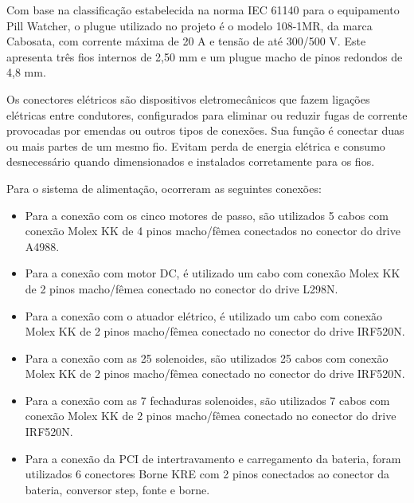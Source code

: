 Com base na classificação estabelecida na norma IEC 61140 para o equipamento Pill Watcher, o plugue utilizado no projeto é o modelo 108-1MR, da marca Cabosata, com corrente máxima de 20 A e tensão de até 300/500 V. Este apresenta três fios internos de 2,50 mm e um plugue macho de pinos redondos de 4,8 mm.  

Os conectores elétricos são dispositivos eletromecânicos que fazem ligações elétricas entre condutores, configurados para eliminar ou reduzir fugas de corrente provocadas por emendas ou outros tipos de conexões.  Sua função é conectar duas ou mais partes de um mesmo fio. Evitam perda de energia elétrica e consumo desnecessário quando dimensionados e instalados corretamente para os fios. 

Para o sistema de alimentação, ocorreram as seguintes conexões:


\begin{itemize}

      \item Para a conexão com os cinco motores de passo, são utilizados 5 cabos com conexão Molex KK de 4 pinos macho/fêmea conectados no conector do drive A4988.
    \item Para a conexão com motor DC, é utilizado um cabo com conexão Molex KK de 2 pinos macho/fêmea conectado no conector do drive L298N.
    \item Para a conexão com o atuador elétrico, é utilizado um cabo com conexão Molex KK de 2 pinos macho/fêmea conectado no conector do drive IRF520N.
     \item Para a conexão com as 25 solenoides, são utilizados 25 cabos com conexão Molex KK de 2 pinos macho/fêmea conectado no conector do drive IRF520N.
    \item Para a conexão com as 7 fechaduras solenoides, são utilizados 7 cabos com conexão Molex KK de 2 pinos macho/fêmea conectado no conector do drive IRF520N.
    \item Para a conexão da PCI de intertravamento e carregamento da bateria, foram utilizados 6 conectores Borne KRE com 2 pinos conectados ao conector da bateria, conversor step, fonte e borne.
     
\end{itemize}

  

 

